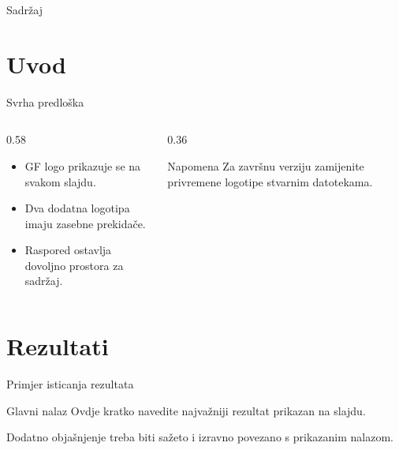 \documentclass[aspectratio=169,11pt]{beamer}
\title{\naslov}
\subtitle{\vrsta{} -- \kolegij}
\author{\autor}
\institute{\studij{} studij, \smjer\\Sveučilište u Rijeci, Građevinski fakultet}
\date{Rijeka, \the\year.}
\begin{document}
\begin{frame}[plain,t]
  \titlepage
\end{frame}

\begin{frame}{Sadržaj}
  \tableofcontents
\end{frame}

\section{Uvod}

\begin{frame}[plain,t]
  \sectionpage
\end{frame}

\begin{frame}{Svrha predloška}
  \begin{columns}[T,onlytextwidth]
    \begin{column}{0.58\textwidth}
      \begin{itemize}
        \item GF logo prikazuje se na svakom slajdu.
        \item Dva dodatna logotipa imaju zasebne prekidače.
        \item Raspored ostavlja dovoljno prostora za sadržaj.
      \end{itemize}
    \end{column}
    \begin{column}{0.36\textwidth}
      \begin{block}{Napomena}
        Za završnu verziju zamijenite privremene logotipe stvarnim datotekama.
      \end{block}
    \end{column}
  \end{columns}
\end{frame}

\section{Rezultati}

\begin{frame}{Primjer isticanja rezultata}
  \begin{alertblock}{Glavni nalaz}
    Ovdje kratko navedite najvažniji rezultat prikazan na slajdu.
  \end{alertblock}

  \vspace{0.18cm}
  Dodatno objašnjenje treba biti sažeto i izravno povezano s prikazanim nalazom.
\end{frame}
\end{document}
